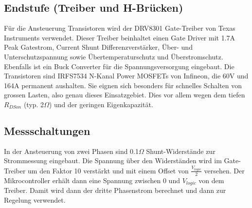 \subsection*{Endstufe (Treiber und H-Brücken)}
Für die Ansteuerung Transistoren wird der DRV8301 Gate-Treiber von Texas Instruments verwendet. Dieser Treiber beinhaltet einen Gate Driver mit 1.7A Peak Gatestrom, Current Shunt Differenzverstärker, Über- und Unterschutzspannung sowie Übertemperaturschutz und Überstromschutz. Ebenfalls ist ein Buck Converter für die Spannungsversorgung eingebaut.
Die Transistoren sind IRFS7534 N-Kanal Power MOSFETs von Infineon, die 60V und 164A permanent aushalten. Sie eignen sich besonders für schnelles Schalten von grossen Lasten, also genau dieses Einsatzgebiet. Dies vor allem wegen dem tiefen $R_{DSon}$ (typ. 2\(\Omega\)) und der geringen Eigenkapazität. 

\subsection*{Messschaltungen}
In der Ansteuerung von zwei Phasen sind 0.1\(\Omega\) Shunt-Widerstände zur Strommessung eingebaut. Die Spannung über den Widerständen wird im Gate-Treiber um den Faktor 10 verstärkt und mit einem Offset von $\frac{V_{logic}}{2}$ versehen. Der Mikrocontroller erhält dann eine Spannung zwischen 0 und $V_{logic}$ von dem Treiber. Damit wird dann der dritte Phasenstrom berechnet und dann zur Regelung verwendet.
